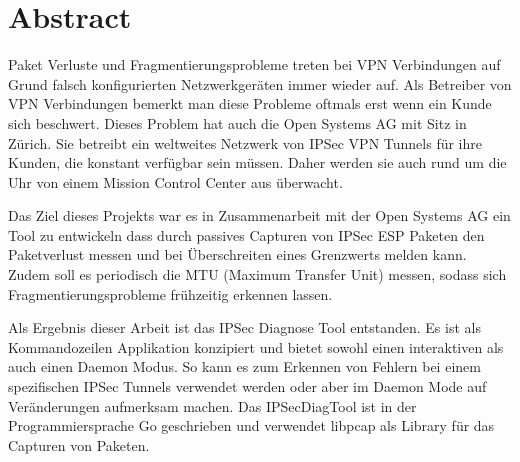 
\chapter*{Abstract}

Paket Verluste und Fragmentierungsprobleme treten bei VPN Verbindungen auf Grund falsch konfigurierten Netzwerkgeräten immer wieder auf. Als Betreiber von VPN Verbindungen bemerkt man diese Probleme oftmals erst wenn ein Kunde sich beschwert. Dieses Problem hat auch die Open Systems AG mit Sitz in Zürich. Sie betreibt ein weltweites Netzwerk von IPSec VPN Tunnels für ihre Kunden, die konstant verfügbar sein müssen. Daher werden sie auch rund um die Uhr von einem Mission Control Center aus überwacht.

Das Ziel dieses Projekts war es in Zusammenarbeit mit der Open Systems AG ein Tool zu entwickeln dass durch passives Capturen von IPSec ESP Paketen den Paketverlust messen und bei Überschreiten eines Grenzwerts melden kann. Zudem soll es periodisch die MTU (Maximum Transfer Unit) messen, sodass sich Fragmentierungsprobleme frühzeitig erkennen lassen.

Als Ergebnis dieser Arbeit ist das IPSec Diagnose Tool entstanden. Es ist als Kommandozeilen Applikation konzipiert und bietet sowohl einen interaktiven als auch einen Daemon Modus. So kann es zum Erkennen von Fehlern bei einem spezifischen IPSec Tunnels verwendet werden oder aber im Daemon Mode auf Veränderungen aufmerksam machen.
Das IPSecDiagTool ist in der Programmiersprache Go geschrieben und verwendet libpcap als Library für das Capturen von Paketen. 